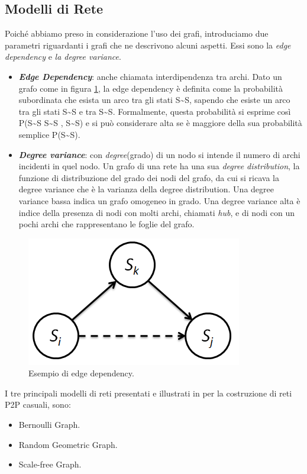 \subsection{Modelli di Rete}
\label{subsec:modelli_rete}
Poiché abbiamo preso in considerazione l'uso dei grafi, introduciamo due parametri riguardanti i grafi che ne descrivono alcuni aspetti. Essi sono la \textit{edge dependency} e \textit{la degree variance}.
\begin{itemize}
	\item \textbf{\textit{Edge Dependency}}: anche chiamata interdipendenza tra archi. Dato un grafo come in figura \ref{fig:edge_dependency_02}, la edge dependency è definita come la probabilità subordinata che esista un arco tra gli stati S\textasciitilde S, sapendo che esiste un arco tra gli stati S\textasciitilde S e tra S\textasciitilde S. Formalmente, questa probabilità si esprime così P(S\textasciitilde S \textbar\: S\textasciitilde S , S\textasciitilde S) e si può considerare alta se è maggiore della sua probabilità semplice P(S\textasciitilde S).
	\item \textbf{\textit{Degree variance}}: con \textit{degree}(grado) di un nodo si intende il numero di archi incidenti in quel nodo. Un grafo di una rete ha una sua \textit{degree distribution}, la funzione di distribuzione del grado dei nodi del grafo, da cui si ricava la degree variance che è la varianza della degree distribution. Una degree variance bassa indica un grafo omogeneo in grado. Una degree variance alta è indice della presenza di nodi con molti archi, chiamati \textit{hub}, e di nodi con un pochi archi che rappresentano le foglie del grafo.
\end{itemize}
\begin{figure}[h]
	\centering
	\includegraphics[width=0.5\linewidth,keepaspectratio]{Images/reti/edge_dependency_02}
	\caption[Edge dependency]{Esempio di edge dependency.}
	\label{fig:edge_dependency_02}
\end{figure}
I tre principali modelli di reti presentati e illustrati in \cite{comparisonGAonRT2012} per la costruzione di reti \acs{P2P} casuali, sono:
\begin{itemize}
	\item Bernoulli Graph.
	\item Random Geometric Graph.
	\item Scale-free Graph.
\end{itemize}
\bigskip

